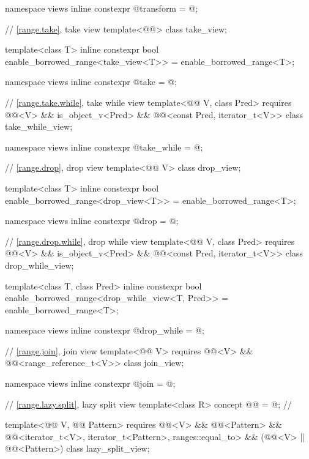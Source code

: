 \begin{codeblock}
{  namespace views { inline constexpr @\unspec@ transform = @\unspec@; }

  // \ref{range.take}, take view
  template<@@> class take_view;

  template<class T>
    inline constexpr bool enable_borrowed_range<take_view<T>> = enable_borrowed_range<T>;

  namespace views { inline constexpr @\unspec@ take = @\unspec@; }

  // \ref{range.take.while}, take while view
  template<@@ V, class Pred>
    requires @@<V> && is_object_v<Pred> &&
             @@<const Pred, iterator_t<V>>
    class take_while_view;

  namespace views { inline constexpr @\unspec@ take_while = @\unspec@; }

  // \ref{range.drop}, drop view
  template<@@ V>
    class drop_view;

  template<class T>
    inline constexpr bool enable_borrowed_range<drop_view<T>> = enable_borrowed_range<T>;

  namespace views { inline constexpr @\unspec@ drop = @\unspec@; }

  // \ref{range.drop.while}, drop while view
  template<@@ V, class Pred>
    requires @@<V> && is_object_v<Pred> &&
             @@<const Pred, iterator_t<V>>
    class drop_while_view;

  template<class T, class Pred>
    inline constexpr bool enable_borrowed_range<drop_while_view<T, Pred>> =
      enable_borrowed_range<T>;

  namespace views { inline constexpr @\unspec@ drop_while = @\unspec@; }

  // \ref{range.join}, join view
  template<@@ V>
    requires @@<V> && @@<range_reference_t<V>>
  class join_view;

  namespace views { inline constexpr @\unspec@ join = @\unspec@; }

  // \ref{range.lazy.split}, lazy split view
  template<class R>
    concept @@ = @\seebelow@;   // \expos

  template<@@ V, @@ Pattern>
    requires @@<V> && @@<Pattern> &&
             @@<iterator_t<V>, iterator_t<Pattern>, ranges::equal_to> &&
             (@@<V> || @@<Pattern>)
  class lazy_split_view;

}
\end{codeblock}
